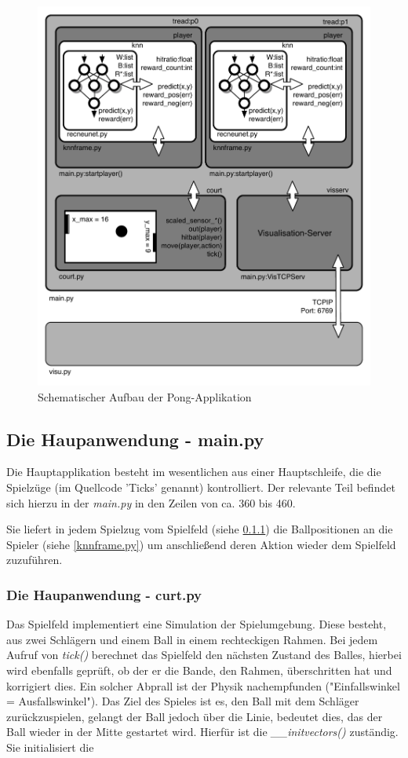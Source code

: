 \documentclass[12pt,twoside]{article}
\theoremstyle{plain}
\theoremstyle{definition}
\theoremstyle{remark}
\begin{document}
\begin{figure}[hbtp]
	 \centerline{\includegraphics[]{ApplicationArchitecture.pdf}}
	 {\caption{Schematischer Aufbau der Pong-Applikation}\label{fig:ApplicationArchitecture}}
\end{figure}


\subsection{Die Haupanwendung - main.py}
\label{main.py}

Die Hauptapplikation besteht im wesentlichen aus einer Hauptschleife, die die Spielzüge (im Quellcode 'Ticks' genannt) kontrolliert. Der relevante Teil befindet sich hierzu in der \textit{main.py} in den Zeilen von ca. 360 bis 460.

Sie liefert in jedem Spielzug vom Spielfeld (siehe \ref{curt.py}) die Ballpositionen an die Spieler (siehe \ref{knnframe.py}) um anschließend deren Aktion wieder dem Spielfeld zuzuführen.

\subsubsection{Die Haupanwendung - curt.py}
\label{curt.py}
Das Spielfeld implementiert eine Simulation der Spielumgebung. Diese besteht, aus zwei Schlägern und einem Ball in einem rechteckigen Rahmen. Bei jedem Aufruf von \textit{tick()} berechnet das Spielfeld den nächsten Zustand des Balles, hierbei wird ebenfalls geprüft, ob der er die Bande, den Rahmen, überschritten hat und korrigiert dies. Ein solcher Abprall ist der Physik nachempfunden ("Einfallswinkel = Ausfallswinkel").
Das Ziel des Spieles ist es, den Ball mit dem Schläger zurückzuspielen, gelangt der Ball jedoch über die Linie, bedeutet dies, das der Ball wieder in der Mitte gestartet wird. Hierfür ist die \textit{__initvectors()} zuständig. Sie initialisiert die 
\end{document}
